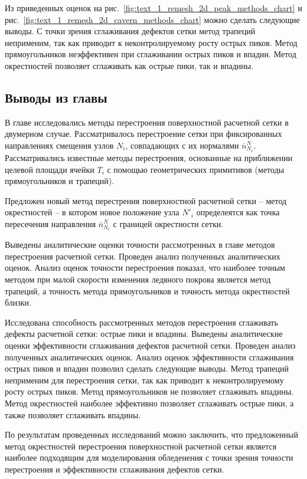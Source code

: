 Из приведенных оценок на рис.~\ref{fig:text_1_remesh_2d_peak_methods_chart} и рис.~\ref{fig:text_1_remesh_2d_cavern_methods_chart} можно сделать следующие выводы.
С точки зрения сглаживания дефектов сетки метод трапеций неприменим, так как приводит к неконтролируемому росту острых пиков.
Метод прямоугольников неэффективен при сглаживании острых пиков и впадин.
Метод окрестностей позволяет сглаживать как острые пики, так и впадины.


\subsection{Выводы из главы}

В главе исследовались методы перестроения поверхностной расчетной сетки в двумерном случае.
Рассматривалось перестроение сетки при фиксированных направлениях смещения узлов $N_i$, совпадающих с их нормалями $\overline{n}_{N_i}^N$.
Рассматривались известные методы перестроения, основанные на приближении целевой площади ячейки $T_i$ с помощью геометрических примитивов (методы прямоугольников и трапеций).

Предложен новый метод перестрения поверхностной расчетной сетки -- метод окрестностей -- в котором новое положение узла $N'_i$ определеятся как точка пересечения направления $\overline{n}_{N_i}^N$ с границей окрестности сетки.

Выведены аналитические оценки точности рассмотренных в главе методов перестроения расчетной сетки.
Проведен анализ полученных аналитических оценок.
Анализ оценок точности перестроения показал, что наиболее точным методом при малой скорости изменения ледяного покрова является метод трапеций, а точность метода прямоугольников и точность метода окрестностей близки.

Исследована способность рассмотренных методов перестроения сглаживать дефекты расчетной сетки: острые пики и впадины.
Выведены аналитические оценки эффективности сглаживания дефектов расчетной сетки.
Проведен анализ полученных аналитических оценок.
Анализ оценок эффективности сглаживания острых пиков и впадин позволил сделать следующие выводы.
Метод трапеций неприменим для перестроения сетки, так как приводит к неконтролируемому росту острых пиков.
Метод прямоугольников не позволяет сглаживать впадины.
Метод окрестностей наиболее эффективно позволяет сглаживать острые пики, а также позволяет сглаживать впадины.

По результатам проведенных исследований можно заключить, что предложенный метод окрестностей перестроения поверхностной расчетной сетки является наиболее подходящим для моделирования обледенения с точки зрения точности перестроения и эффективности сглаживания дефектов сетки.


